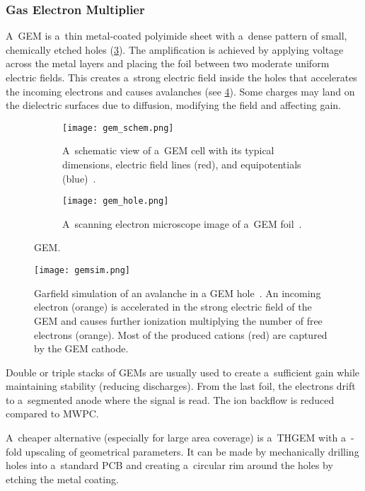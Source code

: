 			\subsubsection{Gas Electron Multiplier}
				A~\acf{GEM} is a~thin metal-coated polyimide sheet with a~dense pattern of small, chemically etched holes (\cref{fig:gem}). The amplification is achieved by applying voltage across the metal layers and placing the foil between two moderate uniform electric fields. This creates a~strong electric field inside the holes that accelerates the incoming electrons and causes avalanches (see \cref{fig:gemsim}). Some charges may land on the dielectric surfaces due to diffusion, modifying the field and affecting gain.
				
				\begin{figure}
					\centering
					\begin{subfigure}[t]{0.48\textwidth}
						\centering
						\texttt{[image: gem\_schem.png]}
						\caption{A~schematic view of a~\ac{GEM} cell with its typical dimensions, electric field lines (red), and equipotentials (blue)~\cite{pdg2024}.}
						\label{fig:gem_schem}
					\end{subfigure}
					\hfill
					\begin{subfigure}[t]{0.48\textwidth}
						\centering
						\texttt{[image: gem\_hole.png]}
						\caption{A~scanning electron microscope image of a~\ac{GEM} foil~\cite{gemhole}.}
						\label{fig:gemhole}
					\end{subfigure}
					\caption{\acf{GEM}.}
					\label{fig:gem}
				\end{figure}
				\begin{figure}
					\centering
					\texttt{[image: gemsim.png]}
					\caption{Garfield simulation of an avalanche in a \ac{GEM} hole~\cite{gemsim}. An incoming electron (orange) is accelerated in the strong electric field of the \ac{GEM} and causes further ionization multiplying the number of free electrons (orange). Most of the produced cations (red) are captured by the \ac{GEM} cathode.}
					\label{fig:gemsim}
				\end{figure}
				
				Double or triple stacks of \acp{GEM} are usually used to create a~sufficient gain while maintaining stability (reducing discharges). From the last foil, the electrons drift to a~segmented anode where the signal is read. The ion backflow is reduced compared to \ac{MWPC}.
				
				A~cheaper alternative (especially for large area coverage) is a~\ac{THGEM} with a~\nobreakdash-fold upscaling of geometrical parameters. It can be made by mechanically drilling holes into a~standard \ac{PCB} and creating a~circular rim around the holes by etching the metal coating.
			
